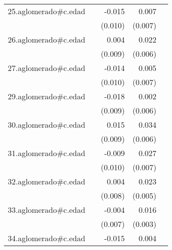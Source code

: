 {\begin{longtable}{l*{4}{D{.}{.}{-1}}}
\addlinespace
25.aglomerado#c.edad&                     &      -0.015         &       0.007         &                     \\
            &                     &     (0.010)         &     (0.007)         &                     \\
\addlinespace
26.aglomerado#c.edad&                     &       0.004         &       0.022\sym{***}&                     \\
            &                     &     (0.009)         &     (0.006)         &                     \\
\addlinespace
27.aglomerado#c.edad&                     &      -0.014         &       0.005         &                     \\
            &                     &     (0.010)         &     (0.007)         &                     \\
\addlinespace
29.aglomerado#c.edad&                     &      -0.018\sym{*}  &       0.002         &                     \\
            &                     &     (0.009)         &     (0.006)         &                     \\
\addlinespace
30.aglomerado#c.edad&                     &       0.015         &       0.034\sym{***}&                     \\
            &                     &     (0.009)         &     (0.006)         &                     \\
\addlinespace
31.aglomerado#c.edad&                     &      -0.009         &       0.027\sym{***}&                     \\
            &                     &     (0.010)         &     (0.007)         &                     \\
\addlinespace
32.aglomerado#c.edad&                     &       0.004         &       0.023\sym{***}&                     \\
            &                     &     (0.008)         &     (0.005)         &                     \\
\addlinespace
33.aglomerado#c.edad&                     &      -0.004         &       0.016\sym{***}&                     \\
            &                     &     (0.007)         &     (0.003)         &                     \\
\addlinespace
34.aglomerado#c.edad&                     &      -0.015         &       0.004         &                     \\

\end{longtable}}
